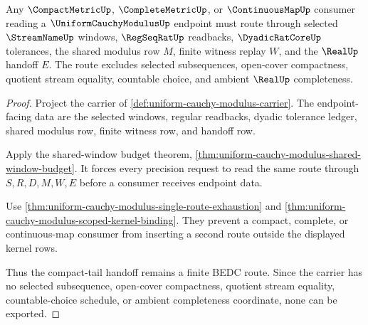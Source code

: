\begin{theorem}
\label{thm:uniform-cauchy-modulus-compact-tail-router}
Any $\CompactMetricUp$, $\CompleteMetricUp$, or $\ContinuousMapUp$ consumer reading a $\UniformCauchyModulusUp$ endpoint must route through selected $\StreamNameUp$ windows, $\RegSeqRatUp$ readbacks, $\DyadicRatCoreUp$ tolerances, the shared modulus row $M$, finite witness replay $W$, and the $\RealUp$ handoff $E$. The route excludes selected subsequences, open-cover compactness, quotient stream equality, countable choice, and ambient $\RealUp$ completeness.
\end{theorem}
\begin{proof}
Project the carrier of \autoref{def:uniform-cauchy-modulus-carrier}. The endpoint-facing data are the selected windows, regular readbacks, dyadic tolerance ledger, shared modulus row, finite witness row, and handoff row.

Apply the shared-window budget theorem, \autoref{thm:uniform-cauchy-modulus-shared-window-budget}. It forces every precision request to read the same route through $S,R,D,M,W,E$ before a consumer receives endpoint data.

Use \autoref{thm:uniform-cauchy-modulus-single-route-exhaustion} and \autoref{thm:uniform-cauchy-modulus-scoped-kernel-binding}. They prevent a compact, complete, or continuous-map consumer from inserting a second route outside the displayed kernel rows.

Thus the compact-tail handoff remains a finite BEDC route. Since the carrier has no selected subsequence, open-cover compactness, quotient stream equality, countable-choice schedule, or ambient completeness coordinate, none can be exported.
\end{proof}




